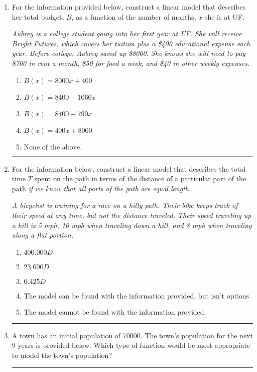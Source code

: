 \documentclass[14pt]{extbook}
\newcommand{\litem}[1]{\item#1\hspace*{-1cm}\rule{\textwidth}{0.4pt}}
\begin{document}
\begin{enumerate}
{\begin{enumerate}[label=\Alph*.]
\end{enumerate} }
\litem{
For the information provided below, construct a linear model that describes her total budget, $B$, as a function of the number of months, $x$ she is at UF.
\begin{center}
    \textit{ Aubrey is a college student going into her first year at UF. She will receive Bright Futures, which covers her tuition plus a \$400 educational expense each year. Before college, Aubrey saved up \$8000. She knows she will need to pay \$700 in rent a month, \$50 for food a week, and \$40 in other weekly expenses. }
\end{center}
\begin{enumerate}[label=\Alph*.]
\item \( B(x) = 8000 x + 400 \)
\item \( B(x) = 8400 - 1060 x \)
\item \( B(x) = 8400 - 790 x \)
\item \( B(x) = 400 x + 8000 \)
\item \( \text{None of the above.} \)

\end{enumerate} }
\litem{
For the information below, construct a linear model that describes the total time $T$ spent on the path in terms of the distance of a particular part of the path \textit{if we know that all parts of the path are equal length}.
\begin{center}
    \textit{ A bicyclist is training for a race on a hilly path. Their bike keeps track of their speed at any time, but not the distance traveled. Their speed traveling up a hill is 5 mph, 10 mph when traveling down a hill, and 8 mph when traveling along a flat portion. }
\end{center}
\begin{enumerate}[label=\Alph*.]
\item \( 400.000 D \)
\item \( 23.000 D \)
\item \( 0.425 D \)
\item \( \text{The model can be found with the information provided, but isn't options 1-3.} \)
\item \( \text{The model cannot be found with the information provided.} \)

\end{enumerate} }
\litem{
A town has an initial population of 70000. The town's population for the next 9 years is provided below. Which type of function would be most appropriate to model the town's population?

}
\end{enumerate}
\end{document}
